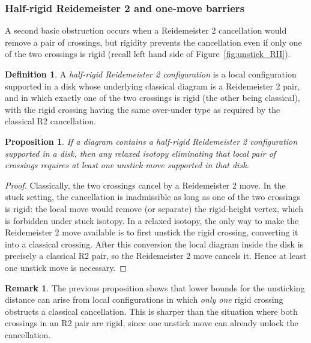 \documentclass[11pt,a4paper]{article}
\theoremstyle{plain}
\newtheorem{proposition}[theorem]{Proposition}
\theoremstyle{definition}
\newtheorem{definition}[theorem]{Definition}
\newtheorem{remark}[theorem]{Remark}
\begin{document}

\subsubsection*{Half-rigid Reidemeister 2 and one-move barriers}

A second basic obstruction occurs when a Reidemeister 2 cancellation would remove a pair of crossings, but rigidity prevents the cancellation even if only one of the two crossings is rigid (recall left hand side of Figure~\ref{fig:unstick_RII}).

\begin{definition}
A \emph{half-rigid Reidemeister 2 configuration} is a local configuration supported in a disk whose underlying classical diagram is a Reidemeister 2 pair, and in which exactly one of the two crossings is
rigid (the other being classical), with the rigid crossing having the same over-under type as required by the classical R2 cancellation.
\end{definition}



\begin{proposition}
If a diagram contains a half-rigid Reidemeister 2 configuration supported in a disk, then any relaxed isotopy eliminating that local pair of crossings requires at least one unstick move supported in that disk.
\end{proposition}

\begin{proof}
Classically, the two crossings cancel by a Reidemeister 2 move. In the stuck setting, the cancellation is inadmissible as long as one of the two crossings is rigid: the local move would remove (or separate) the
rigid-height vertex, which is forbidden under stuck isotopy. In a relaxed isotopy, the only way to make the Reidemeister 2 move available is to first unstick the rigid crossing, converting it into a classical crossing.
After this conversion the local diagram inside the disk is precisely a classical R2 pair, so the Reidemeister 2 move cancels it. Hence at least one unstick move is necessary.
\end{proof}

\begin{remark}
The previous proposition shows that lower bounds for the unsticking distance can arise from local configurations in which \emph{only one} rigid crossing obstructs a classical cancellation. This is sharper than the situation where both crossings in an R2 pair are rigid, since one unstick move can already unlock the cancellation.
\end{remark}
\end{document}
